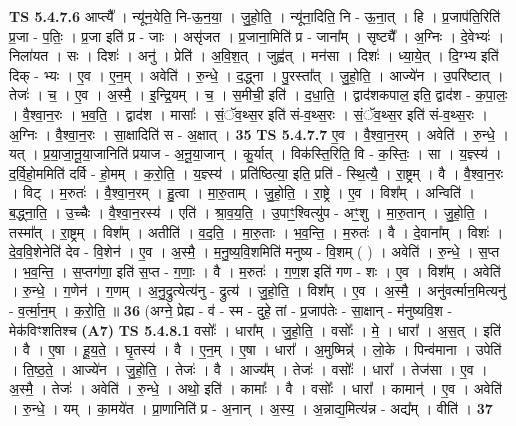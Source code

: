 \documentclass[17pt]{extarticle}
\begin{document}
                                \textbf{ TS 5.4.7.6} \newline
                  आप्त्यै᳚ । न्यू॑न॒येति॒ नि-ऊ॒न॒या॒ । जु॒हो॒ति॒ । न्यू॑ना॒दिति॒ नि - ऊ॒ना॒त् । हि । प्र॒जाप॑ति॒रिति॑ प्र॒जा - प॒तिः॒ । प्र॒जा इति॑ प्र - जाः । असृ॑जत । प्र॒जाना॒मिति॑ प्र - जाना᳚म् । सृष्ट्यै᳚ । अ॒ग्निः । दे॒वेभ्यः॑ । निला॑यत । सः । दिशः॑ । अनु॑ । प्रेति॑ । अ॒वि॒श॒त् । जुह्व॑त् । मन॑सा । दिशः॑ । ध्या॒ये॒त् । दि॒ग्भ्य इति॑ दिक् - भ्यः । ए॒व । ए॒न॒म् । अवेति॑ । रु॒न्धे॒ । द॒द्ध्ना । पु॒रस्ता᳚त् । जु॒हो॒ति॒ । आज्ये॑न । उ॒परि॑ष्टात् । तेजः॑ । च॒ । ए॒व । अ॒स्मै॒ । इ॒न्द्रि॒यम् । च॒ । स॒मीची॒ इति॑ । द॒धा॒ति॒ । द्वाद॑शकपाल॒ इति॒ द्वाद॑श - क॒पा॒लः॒ । वै॒श्वा॒न॒रः । भ॒व॒ति॒ । द्वाद॑श । मासाः᳚ । सं॒ॅव॒थ्स॒र इति॑ सं-व॒थ्स॒रः । सं॒ॅव॒थ्स॒र इति॑ सं-व॒थ्स॒रः । अ॒ग्निः । वै॒श्वा॒न॒रः । सा॒क्षादिति॑ स - अ॒क्षात् । \textbf{  35} \newline
                  \newline
                                \textbf{ TS 5.4.7.7} \newline
                  ए॒व । वै॒श्वा॒न॒रम् । अवेति॑ । रु॒न्धे॒ । यत् । प्र॒या॒जा॒नू॒या॒जानिति॑ प्रयाज - अ॒नू॒या॒जान् । कु॒र्यात् । विक॑स्ति॒रिति॒ वि - क॒स्तिः॒ । सा । य॒ज्ञ्स्य॑ । द॒र्वि॒हो॒ममिति॑ दर्वि - हो॒मम् । क॒रो॒ति॒ । य॒ज्ञ्स्य॑ । प्रति॑ष्ठित्या॒ इति॒ प्रति॑ - स्थि॒त्यै॒ । रा॒ष्ट्रम् । वै । वै॒श्वा॒न॒रः । विट् । म॒रुतः॑ । वै॒श्वा॒न॒रम् । हु॒त्वा । मा॒रु॒ताम् । जु॒हो॒ति॒ । रा॒ष्ट्रे । ए॒व । विश᳚म् । अन्विति॑ । ब॒द्ध्ना॒ति॒ । उ॒च्चैः । वै॒श्वा॒न॒रस्य॑ । एति॑ । श्रा॒व॒य॒ति॒ । उ॒पाꣳ॒॒श्वित्यु॑प - अꣳ॒॒शु । मा॒रु॒तान् । जु॒हो॒ति॒ । तस्मा᳚त् । रा॒ष्ट्रम् । विश᳚म् । अतीति॑ । व॒द॒ति॒ । मा॒रु॒ताः । भ॒व॒न्ति॒ । म॒रुतः॑ । वै । दे॒वाना᳚म् । विशः॑ । दे॒व॒वि॒शेनेति॑ देव - वि॒शेन॑ । ए॒व । अ॒स्मै॒ । म॒नु॒ष्य॒वि॒शमिति॑ मनुष्य - वि॒शम् ( ) । अवेति॑ । रु॒न्धे॒ । स॒प्त । भ॒व॒न्ति॒ । स॒प्तग॑णा॒ इति॑ स॒प्त - ग॒णाः॒ । वै । म॒रुतः॑ । ग॒ण॒श इति॑ गण - शः । ए॒व । विश᳚म् । अवेति॑ । रु॒न्धे॒ । ग॒णेन॑ । ग॒णम् । अ॒नु॒द्रुत्येत्य॑नु - द्रुत्य॑ । जु॒हो॒ति॒ । विश᳚म् । ए॒व । अ॒स्मै॒ । अनु॑वर्त्मान॒मित्यनु॑ - व॒र्त्मा॒न॒म् । क॒रो॒ति॒ ॥ \textbf{  36 } \newline
                  \newline
                      (अग्ने॒ प्रेह्य - व॑ - स्म - दुहे॒ तां - प्र॒जाप॑तेः - सा॒क्षान् - म॑नुष्यवि॒श - मेक॑विꣳशतिश्च  \textbf{(A7)} \newline \newline
                                \textbf{ TS 5.4.8.1} \newline
                  वसोः᳚ । धारा᳚म् । जु॒हो॒ति॒ । वसोः᳚ । मे॒ । धारा᳚ । अ॒स॒त् । इति॑ । वै । ए॒षा । हू॒य॒ते॒ । घृ॒तस्य॑ । वै । ए॒न॒म् । ए॒षा । धारा᳚ । अ॒मुष्मिन्न्॑ । लो॒के । पिन्व॑माना । उपेति॑ । ति॒ष्ठ॒ते॒ । आज्ये॑न । जु॒हो॒ति॒ । तेजः॑ । वै । आज्य᳚म् । तेजः॑ । वसोः᳚ । धारा᳚ । तेज॑सा । ए॒व । अ॒स्मै॒ । तेजः॑ । अवेति॑ । रु॒न्धे॒ । अथो॒ इति॑ । कामाः᳚ । वै । वसोः᳚ । धारा᳚ । कामान्॑ । ए॒व । अवेति॑ । रु॒न्धे॒ । यम् । का॒मये॑त । प्रा॒णानिति॑ प्र - अ॒नान् । अ॒स्य॒ । अ॒न्नाद्य॒मित्य॑न्न - अद्य᳚म् । वीति॑ । \textbf{  37} \newline
\end{document}
